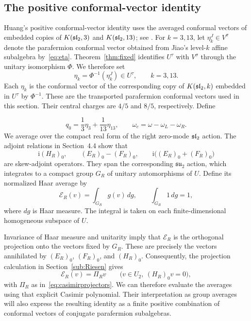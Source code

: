 \documentclass[11pt,reqno]{amsart}
\theoremstyle{definition}\newtheorem{definition}[theorem]{Definition}
\theoremstyle{remark}\newtheorem{remark}[theorem]{Remark}
\numberwithin{equation}{section}
\begin{document}
\subsection{The positive conformal-vector identity}
\leavevmode
\begingroup
Huang's positive conformal-vector identity uses the averaged conformal vectors of embedded copies of $K(\mathfrak{sl}_2,3)$ and $K(\mathfrak{sl}_2,13)$; see \cite[Section 4, (16)]{Huang}. For $k=3,13$, let $\eta_k^J\in V^\sigma$ denote the parafermion conformal vector obtained from Jiao's level-$k$ affine subalgebra by~\eqref{eq:eta}. Theorem~\ref{thm:fixed} identifies $U^\tau$ with $V^\sigma$ through the unitary isomorphism $\Phi$. We therefore set
\[
 \eta_k=\Phi^{-1}(\eta_k^J)\in U^\tau,\qquad k=3,13.
\]
Each $\eta_k$ is the conformal vector of the corresponding copy of $K(\mathfrak{sl}_2,k)$ embedded in $U^\tau$ by $\Phi^{-1}$. These are the transported parafermion conformal vectors used in this section. Their central charges are $4/5$ and $8/5$, respectively. Define
\par\endgroup
\[
 q_0=\frac13\eta_3+\frac1{13}\eta_{13},\qquad
 \omega_c=\omega-\omega_L-\omega_R.
\]
\begingroup
We average over the compact real form of the right zero-mode $\mathfrak{sl}_2$ action. The adjoint relations in Section~4.4 show that
\[
 \mathrm i(H_R)_0,\qquad
 (E_R)_0-(F_R)_0,\qquad
 \mathrm i\bigl((E_R)_0+(F_R)_0\bigr)
\]
are skew-adjoint operators. They span the corresponding $\mathfrak{su}_2$ action, which integrates to a compact group $G_R$ of unitary automorphisms of $U$. Define its normalized Haar average by
\[
 \mathcal E_R(v)=\int_{G_R}g(v)\,dg,
 \qquad \int_{G_R}1\,dg=1,
\]
where $dg$ is Haar measure. The integral is taken on each finite-dimensional homogeneous subspace of $U$.

Invariance of Haar measure and unitarity imply that $\mathcal E_R$ is the orthogonal projection onto the vectors fixed by $G_R$. These are precisely the vectors annihilated by $(E_R)_0$, $(F_R)_0$, and $(H_R)_0$. Consequently, the projection calculation in Section~\ref{sub:Riesen} gives
\[
 \mathcal E_R(v)=\Pi_Rv
 \qquad\bigl(v\in U_2,\ (H_R)_0v=0\bigr),
\]
with $\Pi_R$ as in~\eqref{eq:casimirprojectors}. We can therefore evaluate the averages using that explicit Casimir polynomial. Their interpretation as group averages will also express the resulting identity as a finite positive combination of conformal vectors of conjugate parafermion subalgebras.
\par\endgroup
\end{document}
